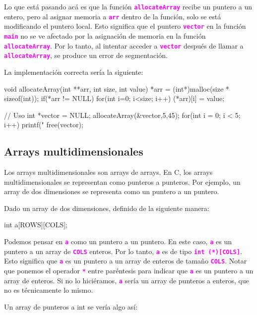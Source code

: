 \documentclass[]{scrartcl}
\newcommand{\hl}[1]{\textcolor{magenta}{\textbf{\texttt{#1}}}}
\begin{document}
Lo que está pasando acá es que la función \hl{allocateArray} recibe un puntero a un entero, pero al asignar memoria a \hl{arr} dentro de la función, solo se está modificando el puntero local. Esto significa que el puntero \hl{vector} en la función \hl{main} no se ve afectado por la asignación de memoria en la función \hl{allocateArray}. Por lo tanto, al intentar acceder a \hl{vector} después de llamar a \hl{allocateArray}, se produce un error de segmentación.

La implementación correcta sería la siguiente:

\begin{cbox}[]{}
  void allocateArray(int **arr, int size, int value) {
    *arr = (int*)malloc(size * sizeof(int));
    if(*arr != NULL) {
      for(int i=0; i<size; i++) {
        (*arr)[i] = value;
      }
    }
  }
  
  // Uso
  int *vector = NULL;
  allocateArray(&vector,5,45);
  for(int i = 0; i < 5; i++)
    printf("%
  free(vector);
\end{cbox}


\subsection*{Arrays multidimensionales}

Los arrays multidimensionales son arrays de arrays. En C, los arrays multidimensionales se representan como punteros a punteros. Por ejemplo, un array de dos dimensiones se representa como un puntero a un puntero. 

Dado un array de dos dimensiones, definido de la siguiente manera:

\begin{cbox}[]{}
  int a[ROWS][COLS];
\end{cbox}

Podemos pensar en \hl{a} como un puntero a un puntero. En este caso, \hl{a} es un puntero a un array de \hl{COLS} enteros. Por lo tanto, \hl{a} es de tipo \hl{int (*)[COLS]}. Esto significa que \hl{a} es un puntero a un array de enteros de tamaño \hl{COLS}. Notar que ponemos el operador \hl{*} entre paréntesis para indicar que \hl{a} es un puntero a un array de enteros. Si no lo hiciéramos, \hl{a} sería un array de punteros a enteros, que no es técnicamente lo mismo.

Un array de punteros a int se vería algo así:

\begin{center}
  \noindent {}
  \label{fig:array-of-pointers-meme}
\end{center}
\end{document}
